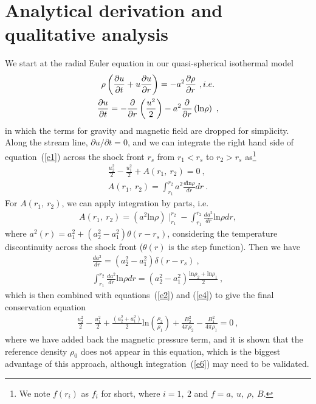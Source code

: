 \documentclass[fleqn,usenatbib]{mnras}
\begin{document}
\section{Analytical derivation and qualitative analysis}
\label{s1}
We start at the radial Euler equation in our quasi-spherical isothermal model 
\begin{gather}
\rho\left(\frac{\partial u}{\partial t}+u\frac{\partial u}{\partial r}\right)=-a^{2}\frac{\partial \rho}{\partial r}\ ,i.e.\notag\\
\frac{\partial u}{\partial t}=-\frac{\partial}{\partial r}\left(\frac{u^{2}}{2}\right)-a^{2}\frac{\partial}{\partial r}\left(\mathrm{ln}\rho\right)\label{e1}\ ,
\end{gather}
in which the terms for gravity and magnetic field are dropped for simplicity. Along the stream line, $\partial u/\partial t=0$, and we can integrate the right hand side of equation~(\ref{e1}) across the shock front $r_{s}$ from $r_{1}<r_{s}$ to $r_{2}>r_{s}$ as\footnote{We note $f(r_{i})$ as $f_{i}$ for short, where $i=1,\ 2$ and $f=a,\ u,\ \rho,\ B$.}
\begin{gather}
\frac{u_{2}^{2}}{2}-\frac{u_{1}^{2}}{2}+A(r_{1},\ r_{2})=0\label{e2}\ ,\\
A(r_{1},\ r_{2})=\int_{r_{1}}^{r_{2}}a^{2}\frac{d\mathrm{ln}\rho}{dr}dr\label{e3}\ .
\end{gather}
For $A(r_{1},\ r_{2})$, we can apply integration by parts, i.e.
\begin{align}
A(r_{1},\ r_{2})=\left(a^{2}\mathrm{ln}\rho\right)\mid_{r_{1}}^{r_{2}}-\int_{r_{1}}^{r_{2}}\frac{da^{2}}{dr}\mathrm{ln}\rho dr\label{e4},
\end{align}
where $a^{2}(r)=a_{1}^{2}+\left(a_{2}^{2}-a_{1}^{2}\right)\theta(r-r_{s})$, considering the temperature discontinuity across the shock front ($\theta(r)$ is the step function). Then we have
\begin{gather}
\frac{d a^{2}}{dr}=\left(a_{2}^{2}-a_{1}^{2}\right)\delta(r-r_{s})\label{e5}\ ,\\
\int_{r_{1}}^{r_{2}}\frac{da^{2}}{dr}\mathrm{ln}\rho dr=\left(a_{2}^{2}-a_{1}^{2}\right)\frac{\mathrm{ln}\rho_{2}+\mathrm{ln}\rho_{1}}{2}\label{e6}\ ,
\end{gather}
which is then combined with equations~(\ref{e2}) and (\ref{e4}) to give the final conservation equation
\begin{gather}
\frac{u_{2}^{2}}{2}-\frac{u_{1}^{2}}{2}+\frac{\left(a_{2}^{2}+a_{1}^{2}\right)}{2}\mathrm{ln}\left(\frac{\rho_{2}}{\rho_{1}}\right)+\frac{B_{2}^{2}}{4\pi\rho_{2}}-\frac{B_{1}^{2}}{4\pi\rho_{1}}=0\label{e7}\ ,
\end{gather}
where we have added back the magnetic pressure term, and it is shown that the reference density $\rho_{0}$ does not appear in this equation, which is the biggest advantage of this approach, although integration~(\ref{e6}) may need to be validated.
\end{document}
